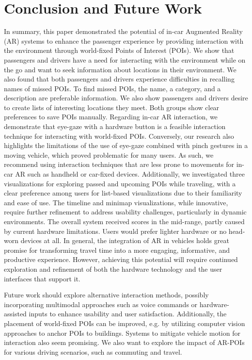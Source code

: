 \section{Conclusion and Future Work}
\label{section:Conclusion}
In summary, this paper demonstrated the potential of in-car Augmented Reality (AR) systems to enhance the passenger experience by providing interaction with the environment through world-fixed Points of Interest (POIs). We show that passengers and drivers have a need for interacting with the environment while on the go and want to seek information about locations in their environment. We also found that both passengers and drivers experience difficulties in recalling names of missed POIs. To find missed POIs, the name, a category, and a description are preferable information. We also show passengers and drivers desire to create lists of interesting locations they meet. Both groups show clear preferences to save POIs manually. Regarding in-car AR interaction, we demonstrate that eye-gaze with a hardware button is a feasible interaction technique for interacting with world-fixed POIs. Conversely, our research also highlights the limitations of the use of eye-gaze combined with pinch gestures in a moving vehicle, which proved problematic for many users. As such, we recommend using interaction techniques that are less prone to movements for in-car AR such as handheld or car-fixed devices. Additionally, we investigated three visualizations for exploring passed and upcoming POIs while traveling, with a clear preference among users for list-based visualizations due to their familiarity and ease of use. The timeline and minimap visualizations, while innovative, require further refinement to address usability challenges, particularly in dynamic environments. The overall system received scores in the mid-range, partly caused by current hardware limitations. Users would prefer lighter hardware or no head-worn devices at all. In general, the integration of AR in vehicles holds great promise for transforming travel time into a more engaging, informative, and productive experience. However, achieving this potential will require continued exploration and refinement of both the hardware technology and the user interfaces that support it.

Future work should explore alternative interaction methods, possibly incorporating multimodal approaches such as voice commands or hardware-assisted inputs to enhance usability and user satisfaction. Additionally, the placement of world-fixed POIs can be improved, e.g. by utilizing computer vision approaches to anchor POIs to buildings. Systems to mitigate vehicle motion for interaction also seem promising. We also want to explore the impact of AR-POIs for various driving scenarios, such as commuting and travel.